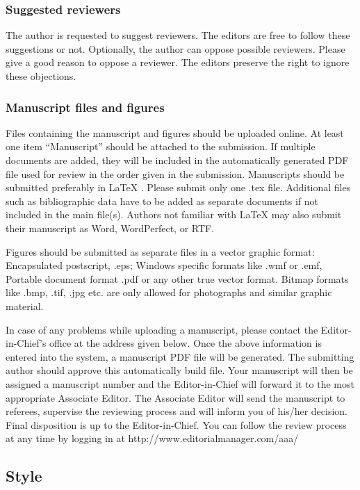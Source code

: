 \documentclass[twoside,twocolumn]{article}
\begin{document}
\subsubsection{Suggested reviewers}

The author is requested to suggest reviewers. The editors are free to
follow these suggestions or not. Optionally, the author can oppose
possible reviewers. Please give a good reason to oppose a reviewer. The
editors preserve the right to ignore these objections.

\subsubsection{Manuscript files and figures}

Files containing the manuscript and figures should be uploaded online.
At least one item ``Manuscript'' should be attached to the submission. If
multiple documents are added, they will be included in the automatically
generated PDF file used for review in the order given in the submission.
Manuscripts should be submitted preferably in \LaTeX{} \cite{1,2}.
Please submit only one .tex file. Additional files such as bibliographic
data have to be added as separate documents if not included in the main
file(s). Authors not familiar with \LaTeX{} may also submit their
manuscript as Word, WordPerfect, or RTF.

Figures should be submitted as separate files in a vector graphic
format: Encapsulated postscript, .eps; Windows specific formats like
.wmf or .emf, Portable document format .pdf or any other true vector
format. Bitmap formats like .bmp, .tif, .jpg etc. are only allowed for
photographs and similar graphic material.

In case of any problems while uploading a manuscript, please contact the
Editor-in-Chief's office at the address given below. Once the above
information is entered into the system, a manuscript PDF file will be
generated. The submitting author should approve this automatically build
file. Your manuscript will then be assigned a manuscript number and the
Editor-in-Chief will forward it to the most appropriate Associate
Editor. The Associate Editor will send the manuscript to referees,
supervise the reviewing process and will inform you of his/her decision.
Final disposition is up to the Editor-in-Chief. You can follow the
review process at any time by logging in at
http://www.editorialmanager.com/aaa/

\subsection{Style}
\end{document}
